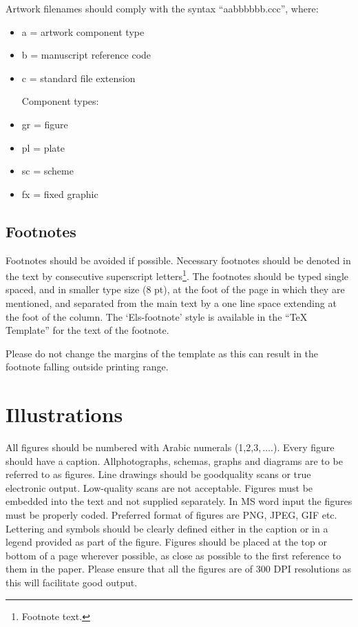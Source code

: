 \documentclass[3p,times,procedia]{elsarticle}
\begin{document}
Artwork filenames should comply with the syntax ``aabbbbbb.ccc'', where:
\begin{itemize}
\item a = artwork component type
\item b = manuscript reference code
\item c = standard file extension

Component types:
\item gr = figure
\item pl = plate
\item sc = scheme
\item fx = fixed graphic
\end{itemize}


\subsection{Footnotes}
Footnotes should be avoided if possible. Necessary footnotes should be denoted in the text by consecutive superscript letters\footnote{Footnote text.}. The footnotes should be typed single spaced, and in smaller type size (8 pt), at the foot of the page in which they are mentioned, and separated from the main text by a one line space extending at the foot of the column. The `Els-footnote' style is available in the ``TeX Template'' for the text of the footnote.

Please do not change the margins of the template as this can result in the footnote falling outside printing range.


\section{Illustrations}
All figures should be numbered with Arabic numerals (1,2,3,$\,\ldots.$). Every figure should have a caption. All\break photographs, schemas, graphs and diagrams are to be referred to as figures. Line drawings should be good\break quality scans or true electronic output. Low-quality scans are not acceptable. Figures must be embedded into the text and not supplied separately. In MS word input the figures must be properly coded. Preferred format of figures are PNG, JPEG, GIF etc. Lettering and symbols should be clearly defined either in the caption or in a legend provided as part of the figure. Figures should be placed at the top or bottom of a page wherever possible, as close as possible to the first reference to them in the paper. Please ensure that all the figures are of 300 DPI resolutions as this will facilitate good output.
\end{document}
